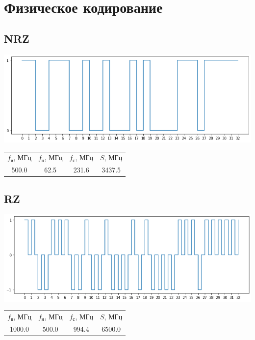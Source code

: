 \section{Физическое кодирование}
\subsection{NRZ}
\includegraphics[width=\textwidth]{3nrz}
\begin{center}
    \begin{tabular}{cccc}
        $f_\mathrm{\text{в}}$, МГц & $f_\mathrm{\text{н}}$, МГц & $f_\mathrm{\text{с}}$, МГц & $S$, МГц \\
        500.0 & 62.5 & 231.6 & 3437.5 \\
    \end{tabular}
\end{center}

\subsection{RZ}
\includegraphics[width=\textwidth]{3rz}
\begin{center}
    \begin{tabular}{cccc}
        $f_\mathrm{\text{в}}$, МГц & $f_\mathrm{\text{н}}$, МГц & $f_\mathrm{\text{с}}$, МГц & $S$, МГц \\
        1000.0 & 500.0 & 994.4 & 6500.0 \\
    \end{tabular}
\end{center}

